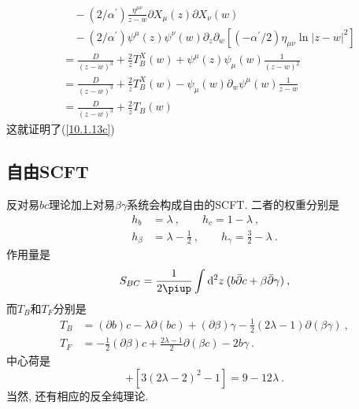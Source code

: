\begin{tcolorbox}
\begin{align*}
&\quad-(2/\alpha ^{\prime })\frac{\eta ^{\mu \nu }}{z-w}\partial X_{\mu
}(z)\partial X_{\nu }(w)\\
&\quad-(2/\alpha ^{\prime })\psi ^{\mu }(z)\psi ^{\nu
}(w)\partial _{z}\partial _{w}[(-\alpha ^{\prime }/2)\eta _{\mu \nu }\ln
|z-w|^{2}] \\
&=\frac{D}{(z-w)^{3}}+\frac{2}{z}T_{B}^{X}(w)+\psi ^{\mu }(z)\psi _{\mu }(w)%
\frac{1}{(z-w)^{2}} \\
&=\frac{D}{(z-w)^{3}}+\frac{2}{z}T_{B}^{X}(w)-\psi _{\mu }(w)\partial
_{w}\psi ^{\mu }(w)\frac{1}{z-w} \\
&=\frac{D}{(z-w)^{3}}+\frac{2}{z}T_{B}(w)
\end{align*}
这就证明了(\ref{10.1.13c})
\end{tcolorbox}

\subsection*{自由SCFT}
反对易$bc$理论加上对易$\beta\gamma$系统会构成自由的SCFT. 二者的权重分别是
\begin{subequations}
\begin{align}
    h_{b}&=\lambda\:,\qquad h_{c}=1-\lambda \:, \label{10.1.16a} \\
    h_{\beta}&=\lambda-\tfrac{1}{2}\:,\qquad h_{\gamma}=\tfrac{3}{2}-\lambda \:. \label{10.1.16b}
\end{align}
\end{subequations}
作用量是
\begin{equation}
    S_{BC}=\frac{1}{2\uppi}\int\dif^{2}z\: (b\bar{\partial}c+\beta\bar{\partial}\gamma)\:, \label{10.1.17}
\end{equation}
而$T_{B}$和$T_{F}$分别是
\begin{subequations}
\begin{align}
    T_{B}&=(\partial b)c-\lambda\partial(bc)+(\partial \beta)\gamma-\frac{1}{2}(2\lambda-1)\partial(\beta\gamma)\:,
    \label{10.1.18a} \\
    T_{F}&=-\frac{1}{2}(\partial \beta)c+ \frac{2\lambda-1}{2}\partial(\beta c)-2b\gamma\:.\label{10.1.18b}
\end{align}
\end{subequations}
中心荷是
\begin{equation}
    [-3(2\lambda-1)^{2}+1]+[3(2\lambda-2)^{2}-1]=9-12\lambda\:.\label{10.1.19}
\end{equation}
当然, 还有相应的反全纯理论.


